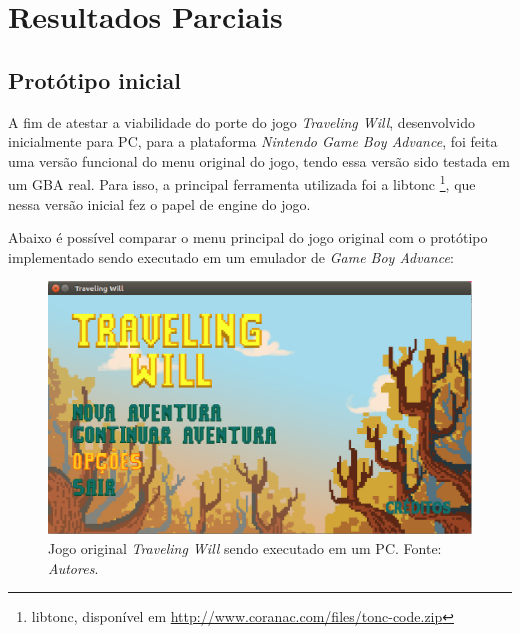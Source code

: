 \chapter[Resultados Parciais]{Resultados Parciais}

\section{Protótipo inicial}

A fim de atestar a viabilidade do porte do jogo \textit{Traveling Will}, desenvolvido inicialmente para PC, para a plataforma \textit{Nintendo Game Boy Advance}, foi feita uma versão funcional do menu original do jogo, tendo essa versão sido testada em um GBA real. Para isso, a principal ferramenta utilizada foi a libtonc \footnote{libtonc, disponível em \url{http://www.coranac.com/files/tonc-code.zip}}, que nessa versão inicial fez o papel de engine do jogo.

Abaixo é possível comparar o menu principal do jogo original com o protótipo implementado sendo executado em um emulador de \textit{Game Boy Advance}:

\begin{figure}[H]
 \centering \includegraphics[keepaspectratio=true,scale=0.6]{figuras/tw-original-1.eps}
   \caption{Jogo original \textit{Traveling Will} sendo executado em um PC. Fonte: \textit{Autores}.}
   \label{tw-original-1}
\end{figure}

